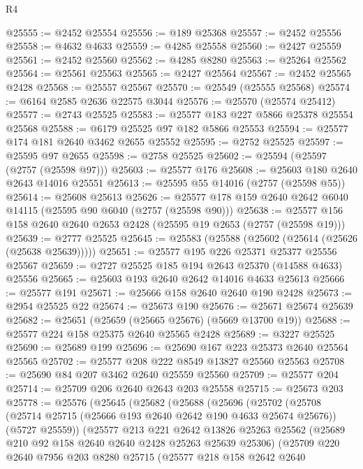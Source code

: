 \begin{lexlean}{R4}
\begin{coremodule}
@25555 := @2452 @25554
@25556 := @189 @25368
@25557 := @2452 @25556
@25558 := @4632 @4633
@25559 := @4285 @25558
@25560 := @2427 @25559
@25561 := @2452 @25560
@25562 := @4285 @8280
@25563 := @25264 @25562
@25564 := @25561 @25563
@25565 := @2427 @25564
@25567 := @2452 @25565 @2428
@25568 := @25557 @25567
@25570 := @25549 (@25555 @25568)
@25574 := @6164 @2585 @2636 @22575 @3044
@25576 := @25570 (@25574 @25412)
@25577 := @2743 @25525
@25583 := @25577 @183 @227 @5866 @25378 @25554 @25568
@25588 := @6179 @25525 @97 @182 @5866 @25553
@25594 := @25577 @174 @181 @2640 @3462 @2655 @25552
@25595 := @2752 @25525
@25597 := @25595 @97 @2655
@25598 := @2758 @25525
@25602 := @25594 (@25597 (@2757 (@25598 @97)))
@25603 := @25577 @176
@25608 := @25603 @180 @2640 @2643 @14016 @25551
@25613 := @25595 @55 @14016 (@2757 (@25598 @55))
@25614 := @25608 @25613
@25626 := @25577 @178 @159 @2640 @2642 @6040 @14115 (@25595 @90 @6040 (@2757 (@25598 @90)))
@25638 := @25577 @156 @158 @2640 @2640 @2653 @2428 (@25595 @19 @2653 (@2757 (@25598 @19)))
@25639 := @2777 @25525
@25645 := @25583 (@25588 (@25602 (@25614 (@25626 (@25638 @25639)))))
@25651 := @25577 @195 @226 @25371 @25377 @25556 @25567
@25659 := @2727 @25525 @185 @194 @2643 @25370 (@14588 @4633) @25556
@25665 := @25603 @193 @2640 @2642 @14016 @4633 @25613
@25666 := @25577 @191
@25671 := @25666 @158 @2640 @2640 @190 @2428
@25673 := @2954 @25525 @22
@25674 := @25673 @190
@25676 := @25671 @25674 @25639
@25682 := @25651 (@25659 (@25665 @25676) (@5669 @13700 @19))
@25688 := @25577 @224 @158 @25375 @2640 @25565 @2428
@25689 := @3227 @25525
@25690 := @25689 @199
@25696 := @25690 @167 @223 @25373 @2640 @25564 @25565
@25702 := @25577 @208 @222 @8549 @13827 @25560 @25563
@25708 := @25690 @84 @207 @3462 @2640 @25559 @25560
@25709 := @25577 @204
@25714 := @25709 @206 @2640 @2643 @203 @25558
@25715 := @25673 @203
@25778 := @25576
    (@25645
      (@25682
        (@25688
          (@25696
            (@25702
              (@25708
                (@25714 @25715 (@25666 @193 @2640 @2642 @190 @4633 @25674 @25676))
                (@5727 @25559))
              (@25577
                @213
                @221
                @2642
                @13826
                @25263
                @25562
                (@25689 @210 @92 @158 @2640 @2640 @2428 @25263 @25639 @25306)
                (@25709
                  @220
                  @2640
                  @7956
                  @203
                  @8280
                  @25715
                  (@25577
                    @218
                    @158
                    @2642
                    @2640

\end{coremodule}
\end{lexlean}
